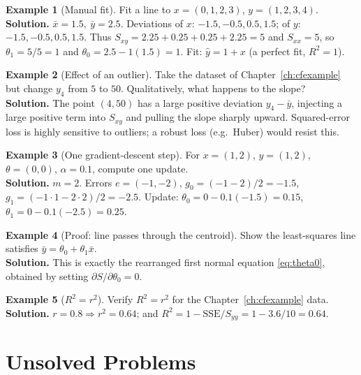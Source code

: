 \documentclass[11pt,a4paper]{report}
\theoremstyle{definition}
\newtheorem{example}{Example}[chapter]
\theoremstyle{plain}
\theoremstyle{remark}
\newcommand{\xbar}{\bar{x}}
\newcommand{\ybar}{\bar{y}}
\begin{document}
	\begin{example}[Manual fit]
		Fit a line to $x=(0,1,2,3)$, $y=(1,2,3,4)$.\\
		\textbf{Solution.} $\xbar=1.5,\ \ybar=2.5$. Deviations of $x$: $-1.5,-0.5,0.5,1.5$;
		of $y$: $-1.5,-0.5,0.5,1.5$. Thus $S_{xy}=2.25+0.25+0.25+2.25=5$ and
		$S_{xx}=5$, so $\theta_1=5/5=1$ and $\theta_0=2.5-1(1.5)=1$. Fit:
		$\hat y=1+x$ (a perfect fit, $R^2=1$).
	\end{example}
	
	\begin{example}[Effect of an outlier]
		Take the dataset of Chapter~\ref{ch:cfexample} but change $y_4$ from $5$ to
		$50$. Qualitatively, what happens to the slope? \\
		\textbf{Solution.} The point $(4,50)$ has a large positive deviation
		$y_4-\ybar$, injecting a large positive term into $S_{xy}$ and pulling the
		slope sharply upward. Squared-error loss is highly sensitive to outliers; a
		robust loss (e.g.\ Huber) would resist this.
	\end{example}
	
	\begin{example}[One gradient-descent step]
		For $x=(1,2)$, $y=(1,2)$, $\theta=(0,0)$, $\alpha=0.1$, compute one update.\\
		\textbf{Solution.} $m=2$. Errors $e=(-1,-2)$, $g_0=(-1-2)/2=-1.5$,
		$g_1=(-1\cdot1-2\cdot2)/2=-2.5$. Update:
		$\theta_0=0-0.1(-1.5)=0.15$, $\theta_1=0-0.1(-2.5)=0.25$.
	\end{example}
	
	\begin{example}[Proof: line passes through the centroid]
		Show the least-squares line satisfies $\ybar=\theta_0+\theta_1\xbar$.\\
		\textbf{Solution.} This is exactly the rearranged first normal equation
		\eqref{eq:theta0}, obtained by setting $\partial S/\partial\theta_0=0$.
	\end{example}
	
	\begin{example}[$R^2=r^2$]
		Verify $R^2=r^2$ for the Chapter~\ref{ch:cfexample} data.\\
		\textbf{Solution.} $r=0.8\Rightarrow r^2=0.64$; and
		$R^2=1-\text{SSE}/S_{yy}=1-3.6/10=0.64$. \checkmark
	\end{example}
	
	\section{Unsolved Problems}
	
\end{document}
